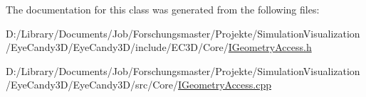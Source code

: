 The documentation for this class was generated from the following files\+:\begin{DoxyCompactItemize}
\item 
D\+:/\+Library/\+Documents/\+Job/\+Forschungsmaster/\+Projekte/\+Simulation\+Visualization/\+Eye\+Candy3\+D/\+Eye\+Candy3\+D/include/\+E\+C3\+D/\+Core/\mbox{\hyperlink{_i_geometry_access_8h}{I\+Geometry\+Access.\+h}}\item 
D\+:/\+Library/\+Documents/\+Job/\+Forschungsmaster/\+Projekte/\+Simulation\+Visualization/\+Eye\+Candy3\+D/\+Eye\+Candy3\+D/src/\+Core/\mbox{\hyperlink{_i_geometry_access_8cpp}{I\+Geometry\+Access.\+cpp}}\end{DoxyCompactItemize}
